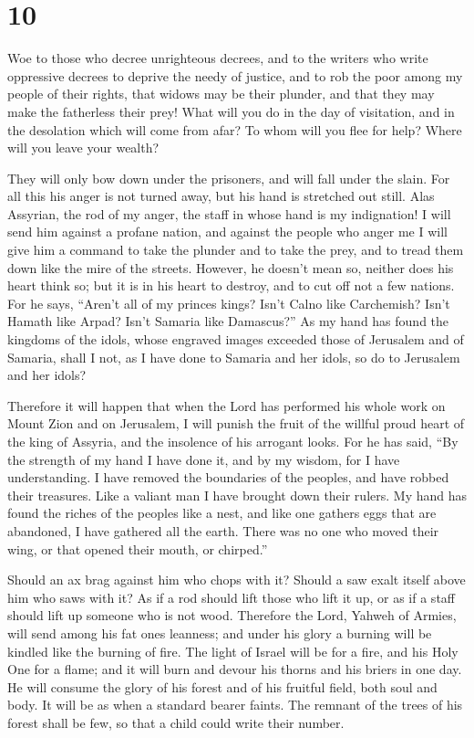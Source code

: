 \hypertarget{section-9}{%
\section{10}\label{section-9}}

 Woe to those who decree unrighteous decrees, and to the
writers who write oppressive decrees  to deprive the needy
of justice, and to rob the poor among my people of their rights, that
widows may be their plunder, and that they may make the fatherless their
prey!  What will you do in the day of visitation, and in the
desolation which will come from afar? To whom will you flee for help?
Where will you leave your wealth?

 They will only bow down under the prisoners, and will fall
under the slain. For all this his anger is not turned away, but his hand
is stretched out still.  Alas Assyrian, the rod of my anger,
the staff in whose hand is my indignation!  I will send him
against a profane nation, and against the people who anger me I will
give him a command to take the plunder and to take the prey, and to
tread them down like the mire of the streets.  However, he
doesn't mean so, neither does his heart think so; but it is in his heart
to destroy, and to cut off not a few nations.  For he says,
``Aren't all of my princes kings?  Isn't Calno like
Carchemish? Isn't Hamath like Arpad? Isn't Samaria like Damascus?''
 As my hand has found the kingdoms of the idols, whose
engraved images exceeded those of Jerusalem and of Samaria,
 shall I not, as I have done to Samaria and her idols, so
do to Jerusalem and her idols?

 Therefore it will happen that when the Lord has performed
his whole work on Mount Zion and on Jerusalem, I will punish the fruit
of the willful proud heart of the king of Assyria, and the insolence of
his arrogant looks.  For he has said, ``By the strength of
my hand I have done it, and by my wisdom, for I have understanding. I
have removed the boundaries of the peoples, and have robbed their
treasures. Like a valiant man I have brought down their rulers.
 My hand has found the riches of the peoples like a nest,
and like one gathers eggs that are abandoned, I have gathered all the
earth. There was no one who moved their wing, or that opened their
mouth, or chirped.''

 Should an ax brag against him who chops with it? Should a
saw exalt itself above him who saws with it? As if a rod should lift
those who lift it up, or as if a staff should lift up someone who is not
wood.  Therefore the Lord, Yahweh of Armies, will send
among his fat ones leanness; and under his glory a burning will be
kindled like the burning of fire.  The light of Israel will
be for a fire, and his Holy One for a flame; and it will burn and devour
his thorns and his briers in one day.  He will consume the
glory of his forest and of his fruitful field, both soul and body. It
will be as when a standard bearer faints.  The remnant of
the trees of his forest shall be few, so that a child could write their
number.

